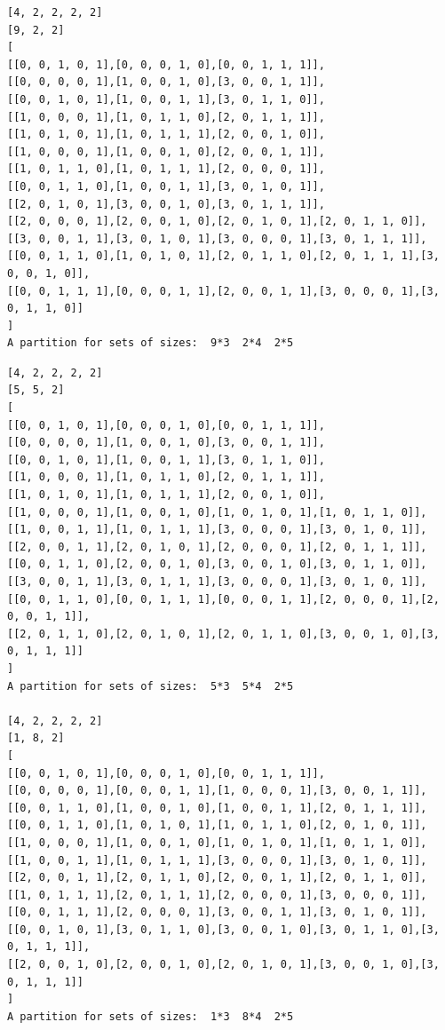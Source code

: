 \documentclass[final]{dmtcs-episciences}
\begin{document}
\begin{appendices}
\begin{verbatim}
[4, 2, 2, 2, 2]
[9, 2, 2]
[
[[0, 0, 1, 0, 1],[0, 0, 0, 1, 0],[0, 0, 1, 1, 1]],
[[0, 0, 0, 0, 1],[1, 0, 0, 1, 0],[3, 0, 0, 1, 1]],
[[0, 0, 1, 0, 1],[1, 0, 0, 1, 1],[3, 0, 1, 1, 0]],
[[1, 0, 0, 0, 1],[1, 0, 1, 1, 0],[2, 0, 1, 1, 1]],
[[1, 0, 1, 0, 1],[1, 0, 1, 1, 1],[2, 0, 0, 1, 0]],
[[1, 0, 0, 0, 1],[1, 0, 0, 1, 0],[2, 0, 0, 1, 1]],
[[1, 0, 1, 1, 0],[1, 0, 1, 1, 1],[2, 0, 0, 0, 1]],
[[0, 0, 1, 1, 0],[1, 0, 0, 1, 1],[3, 0, 1, 0, 1]],
[[2, 0, 1, 0, 1],[3, 0, 0, 1, 0],[3, 0, 1, 1, 1]],
[[2, 0, 0, 0, 1],[2, 0, 0, 1, 0],[2, 0, 1, 0, 1],[2, 0, 1, 1, 0]],
[[3, 0, 0, 1, 1],[3, 0, 1, 0, 1],[3, 0, 0, 0, 1],[3, 0, 1, 1, 1]],
[[0, 0, 1, 1, 0],[1, 0, 1, 0, 1],[2, 0, 1, 1, 0],[2, 0, 1, 1, 1],[3, 0, 0, 1, 0]],
[[0, 0, 1, 1, 1],[0, 0, 0, 1, 1],[2, 0, 0, 1, 1],[3, 0, 0, 0, 1],[3, 0, 1, 1, 0]]
]
A partition for sets of sizes:  9*3  2*4  2*5
\end{verbatim}

\newpage

\begin{verbatim} 
[4, 2, 2, 2, 2]
[5, 5, 2]
[
[[0, 0, 1, 0, 1],[0, 0, 0, 1, 0],[0, 0, 1, 1, 1]],
[[0, 0, 0, 0, 1],[1, 0, 0, 1, 0],[3, 0, 0, 1, 1]],
[[0, 0, 1, 0, 1],[1, 0, 0, 1, 1],[3, 0, 1, 1, 0]],
[[1, 0, 0, 0, 1],[1, 0, 1, 1, 0],[2, 0, 1, 1, 1]],
[[1, 0, 1, 0, 1],[1, 0, 1, 1, 1],[2, 0, 0, 1, 0]],
[[1, 0, 0, 0, 1],[1, 0, 0, 1, 0],[1, 0, 1, 0, 1],[1, 0, 1, 1, 0]],
[[1, 0, 0, 1, 1],[1, 0, 1, 1, 1],[3, 0, 0, 0, 1],[3, 0, 1, 0, 1]],
[[2, 0, 0, 1, 1],[2, 0, 1, 0, 1],[2, 0, 0, 0, 1],[2, 0, 1, 1, 1]],
[[0, 0, 1, 1, 0],[2, 0, 0, 1, 0],[3, 0, 0, 1, 0],[3, 0, 1, 1, 0]],
[[3, 0, 0, 1, 1],[3, 0, 1, 1, 1],[3, 0, 0, 0, 1],[3, 0, 1, 0, 1]],
[[0, 0, 1, 1, 0],[0, 0, 1, 1, 1],[0, 0, 0, 1, 1],[2, 0, 0, 0, 1],[2, 0, 0, 1, 1]],
[[2, 0, 1, 1, 0],[2, 0, 1, 0, 1],[2, 0, 1, 1, 0],[3, 0, 0, 1, 0],[3, 0, 1, 1, 1]]
]
A partition for sets of sizes:  5*3  5*4  2*5

[4, 2, 2, 2, 2]
[1, 8, 2]
[
[[0, 0, 1, 0, 1],[0, 0, 0, 1, 0],[0, 0, 1, 1, 1]],
[[0, 0, 0, 0, 1],[0, 0, 0, 1, 1],[1, 0, 0, 0, 1],[3, 0, 0, 1, 1]],
[[0, 0, 1, 1, 0],[1, 0, 0, 1, 0],[1, 0, 0, 1, 1],[2, 0, 1, 1, 1]],
[[0, 0, 1, 1, 0],[1, 0, 1, 0, 1],[1, 0, 1, 1, 0],[2, 0, 1, 0, 1]],
[[1, 0, 0, 0, 1],[1, 0, 0, 1, 0],[1, 0, 1, 0, 1],[1, 0, 1, 1, 0]],
[[1, 0, 0, 1, 1],[1, 0, 1, 1, 1],[3, 0, 0, 0, 1],[3, 0, 1, 0, 1]],
[[2, 0, 0, 1, 1],[2, 0, 1, 1, 0],[2, 0, 0, 1, 1],[2, 0, 1, 1, 0]],
[[1, 0, 1, 1, 1],[2, 0, 1, 1, 1],[2, 0, 0, 0, 1],[3, 0, 0, 0, 1]],
[[0, 0, 1, 1, 1],[2, 0, 0, 0, 1],[3, 0, 0, 1, 1],[3, 0, 1, 0, 1]],
[[0, 0, 1, 0, 1],[3, 0, 1, 1, 0],[3, 0, 0, 1, 0],[3, 0, 1, 1, 0],[3, 0, 1, 1, 1]],
[[2, 0, 0, 1, 0],[2, 0, 0, 1, 0],[2, 0, 1, 0, 1],[3, 0, 0, 1, 0],[3, 0, 1, 1, 1]]
]
A partition for sets of sizes:  1*3  8*4  2*5


\end{verbatim}
\end{appendices}
\end{document}
